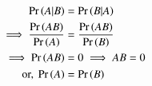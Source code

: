 \begin{align}
\pr{A|B} &= \pr{B|A}\\
\implies \frac{\pr{AB}}{\pr{A}} &= \frac{\pr{AB}}{\pr{B}}\\
\implies \pr{AB} &= 0 \implies AB = 0
\\
\text{ or, } \pr{A} &= \pr{B}
\end{align}

